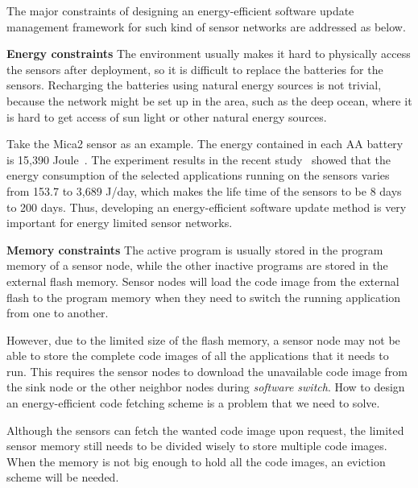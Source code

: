 The major constraints of designing an energy-efficient software update management framework for such kind of sensor networks are addressed as below.

\textbf{Energy constraints}
The environment usually makes it hard to physically access the sensors after deployment, so it is difficult to replace the batteries for the sensors. Recharging the batteries using natural energy sources is not trivial, because the network might be set up in the area, such as the deep ocean, where it is hard to get access of sun light or other natural energy sources. 

Take the Mica2 sensor as an example. The energy contained in each AA battery is 15,390 Joule~\cite{battery-energy}. The experiment results in the recent study~\cite{power-tossim} showed that the energy consumption of the selected applications running on the sensors varies from 153.7 to 3,689 J/day, which makes the life time of the sensors to be 8 days to 200 days. Thus, developing an energy-efficient software update method is very important for energy limited sensor networks.


\textbf{Memory constraints}
The active program is usually stored in the program memory of a sensor node, while the other inactive programs are stored in the external flash memory. Sensor nodes will load the code image from the external flash to the program memory when they need to switch the running application from one to another.

However, due to the limited size of the flash memory, a sensor node may not be able to store the complete code images of all the applications that it needs to run. This requires the sensor nodes to download the unavailable code image from the sink node or the other neighbor nodes during {\it software switch}. How to design an energy-efficient code fetching scheme is a problem that we need to solve.

Although the sensors can fetch the wanted code image upon request, the limited sensor memory still needs to be divided wisely to store multiple code images. When the memory is not big enough to hold all the code images, an eviction scheme will be needed.


